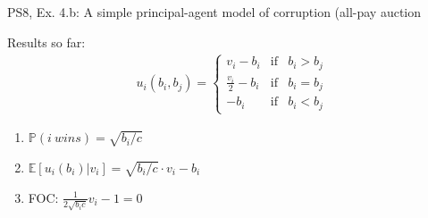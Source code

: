 \begin{frame}{PS8, Ex. 4.b: A simple principal-agent model of corruption (all-pay auction}
\begin{multicols}{2}
      Results so far: \vspace{-6pt}
      \begin{align*}
        u_i(b_i,b_j)=\left\{\begin{array}{lcl}
          v_i-b_i           & \text{if} & b_i>b_j \\
          \frac{v_i}{2}-b_i & \text{if} & b_i=b_j \\
          -b_i              & \text{if} & b_i<b_j
        \end{array}\right.
      \end{align*} \vspace{-16pt}
      \begin{enumerate}
        \item $\mathbb{P}(i\ wins)=\sqrt{b_i/c}$
        \item $\mathbb{E}[u_i(b_i)|v_i]=\sqrt{b_i/c}\cdot v_i-b_i$
        \item FOC: $\frac{1}{2\sqrt{b_ic}}v_i-1=0$
      \end{enumerate}
      \vfill\null
    \end{multicols}
\end{frame}

